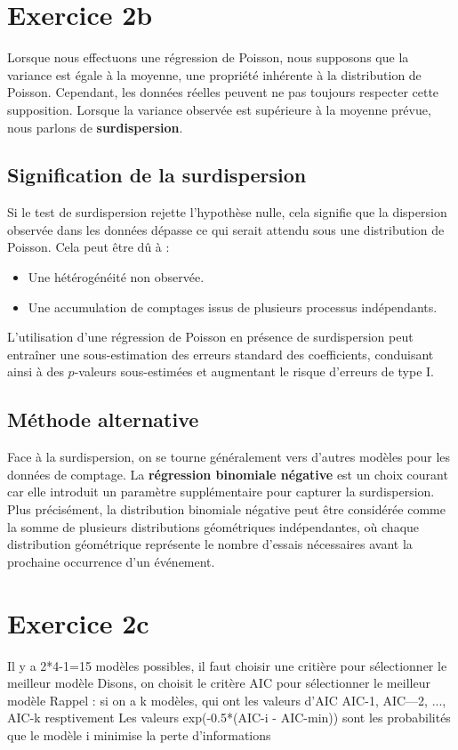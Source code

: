 \documentclass{article}
\begin{document}
\section{Exercice 2b}

Lorsque nous effectuons une régression de Poisson, nous supposons que la variance est égale à la moyenne, une propriété inhérente à la distribution de Poisson. Cependant, les données réelles peuvent ne pas toujours respecter cette supposition. Lorsque la variance observée est supérieure à la moyenne prévue, nous parlons de \textbf{surdispersion}.

\subsection*{Signification de la surdispersion}

Si le test de surdispersion rejette l'hypothèse nulle, cela signifie que la dispersion observée dans les données dépasse ce qui serait attendu sous une distribution de Poisson. Cela peut être dû à :
\begin{itemize}
    \item Une hétérogénéité non observée.
    \item Une accumulation de comptages issus de plusieurs processus indépendants.
\end{itemize}

L'utilisation d'une régression de Poisson en présence de surdispersion peut entraîner une sous-estimation des erreurs standard des coefficients, conduisant ainsi à des $p$-valeurs sous-estimées et augmentant le risque d'erreurs de type I.

\subsection*{Méthode alternative}

Face à la surdispersion, on se tourne généralement vers d'autres modèles pour les données de comptage. La \textbf{régression binomiale négative} est un choix courant car elle introduit un paramètre supplémentaire pour capturer la surdispersion. Plus précisément, la distribution binomiale négative peut être considérée comme la somme de plusieurs distributions géométriques indépendantes, où chaque distribution géométrique représente le nombre d'essais nécessaires avant la prochaine occurrence d'un événement.

\section{Exercice 2c}
 Il y a 2*4-1=15 modèles possibles, il faut choisir une critière pour sélectionner le meilleur modèle
Disons, on choisit le critère AIC pour sélectionner le meilleur modèle
Rappel : si on a k modèles, qui ont les valeurs d'AIC  AIC-1, AIC—2, ..., AIC-k resptivement
Les valeurs exp(-0.5*(AIC-i - AIC-min)) sont les probabilités que le modèle i 
minimise la perte d'informations
\end{document}

